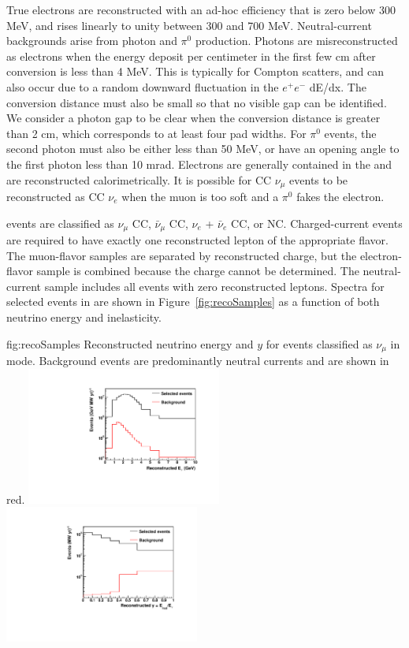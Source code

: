 True electrons are reconstructed with an ad-hoc efficiency that is zero below 300 MeV, and rises linearly to unity between 300 and 700 MeV. Neutral-current backgrounds arise from photon and $\pi^{0}$ production. Photons are misreconstructed as electrons when the energy deposit per centimeter in the first few cm after conversion is less than 4 MeV. This is typically for Compton scatters, and can also occur due to a random downward fluctuation in the $e^{+}e^{-}$ dE/dx. The conversion distance must also be small so that no visible gap can be identified. We consider a photon gap to be clear when the conversion distance is greater than 2 cm, which corresponds to at least four pad widths. For $\pi^{0}$ events, the second photon must also be either less than 50 MeV, or have an opening angle to the first photon less than 10 mrad. Electrons are generally contained in the  and are reconstructed calorimetrically. It is possible for CC $\nu_{\mu}$ events to be reconstructed as CC $\nu_{e}$ when the muon is too soft and a $\pi^{0}$ fakes the electron.

 events are classified as $\nu_{\mu}$ CC, $\bar{\nu}_{\mu}$ CC, $\nu_{e}$ + $\bar{\nu}_{e}$ CC, or NC. Charged-current events are required to have exactly one reconstructed lepton of the appropriate flavor. The muon-flavor samples are separated by reconstructed charge, but the electron-flavor sample is combined because the charge cannot be determined. The neutral-current sample includes all events with zero reconstructed leptons. Spectra for selected \numu {} events in  are shown in Figure~\ref{fig:recoSamples} as a function of both neutrino energy and inelasticity.

\begin{dunefigure}{fig:recoSamples}
{Reconstructed neutrino energy and $y$ for events classified as $\nu_{\mu}$  in  mode. Background events are predominantly neutral currents and are shown in red.}
 \includegraphics[width=0.48\textwidth]{graphics/FHC_selected_Ev_log.pdf}
 \includegraphics[width=0.48\textwidth]{graphics/FHC_selected_y_log.pdf}
\end{dunefigure}


